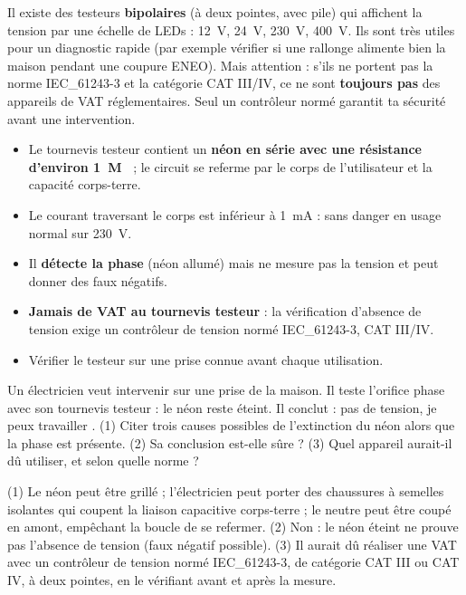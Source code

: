 \documentclass[11pt]{article}
\begin{document}
\begin{savaistu}
Il existe des testeurs \textbf{bipolaires} (à deux pointes, avec pile) qui affichent la tension par une échelle de LEDs : \SI{12}{V}, \SI{24}{V}, \SI{230}{V}, \SI{400}{V}. Ils sont très utiles pour un diagnostic rapide (par exemple vérifier si une rallonge alimente bien la maison pendant une coupure ENEO). Mais attention : s'ils ne portent pas la norme IEC\_61243-3 et la catégorie CAT III/IV, ce ne sont \textbf{toujours pas} des appareils de VAT réglementaires. Seul un contrôleur normé garantit ta sécurité avant une intervention.
\end{savaistu}

\begin{aretenir}
\begin{itemize}
\item Le tournevis testeur contient un \textbf{néon en série avec une résistance d'environ \SI{1}{M\Omega}} ; le circuit se referme par le corps de l'utilisateur et la capacité corps-terre.
\item Le courant traversant le corps est inférieur à \SI{1}{mA} : sans danger en usage normal sur \SI{230}{V}.
\item Il \textbf{détecte la phase} (néon allumé) mais ne mesure pas la tension et peut donner des faux négatifs.
\item \textbf{Jamais de VAT au tournevis testeur} : la vérification d'absence de tension exige un contrôleur de tension normé IEC\_61243-3, CAT III/IV.
\item Vérifier le testeur sur une prise connue avant chaque utilisation.
\end{itemize}
\end{aretenir}

\begin{exercice}
Un électricien veut intervenir sur une prise de la maison. Il teste l'orifice phase avec son tournevis testeur : le néon reste éteint. Il conclut : \og pas de tension, je peux travailler \fg{}. (1) Citer trois causes possibles de l'extinction du néon alors que la phase est présente. (2) Sa conclusion est-elle sûre ? (3) Quel appareil aurait-il dû utiliser, et selon quelle norme ?
\end{exercice}

\begin{corrige}[Exercice 1]
(1) Le néon peut être grillé ; l'électricien peut porter des chaussures à semelles isolantes qui coupent la liaison capacitive corps-terre ; le neutre peut être coupé en amont, empêchant la boucle de se refermer. (2) Non : le néon éteint ne prouve pas l'absence de tension (faux négatif possible). (3) Il aurait dû réaliser une VAT avec un contrôleur de tension normé IEC\_61243-3, de catégorie CAT III ou CAT IV, à deux pointes, en le vérifiant avant et après la mesure.
\end{corrige}
\end{document}
